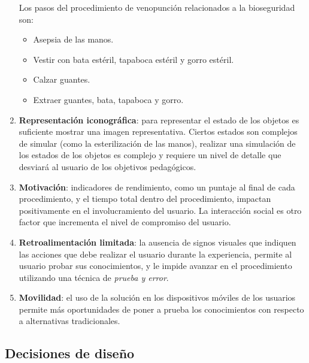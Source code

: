 \begin{enumerate}[label=\bfseries C\arabic*:]
    Los pasos del procedimiento de venopunción relacionados a la bioseguridad son:
    \begin{itemize}
        \item Asepsia de las manos.
        \item Vestir con bata estéril, tapaboca estéril y gorro estéril.
        \item Calzar guantes.
        \item Extraer guantes, bata, tapaboca y gorro.
    \end{itemize}
    
\item \textbf{Representación iconográfica}: para representar el estado de los
    objetos es suficiente mostrar una imagen representativa. Ciertos estados son
    complejos de simular (como la esterilización de las manos), realizar una
    simulación de los estados de los objetos es complejo y requiere un nivel de
    detalle que desviará al usuario de los objetivos pedagógicos.
    
\item \textbf{Motivación}: indicadores de rendimiento, como un puntaje al final
    de cada procedimiento, y el tiempo total dentro del procedimiento, impactan
    positivamente en el involucramiento del usuario. La interacción social es
    otro factor que incrementa el nivel de compromiso del usuario.

\item \textbf{Retroalimentación limitada}: la ausencia de signos visuales que
    indiquen las acciones que debe realizar el usuario durante la experiencia,
    permite al usuario probar sus conocimientos, y le impide avanzar en
    el procedimiento utilizando una técnica de \emph{prueba y error}.

\item \textbf{Movilidad}: el uso de la solución en los dispositivos móviles de
    los usuarios permite más oportunidades de poner a prueba los conocimientos
    con respecto a alternativas tradicionales.


\end{enumerate}

\subsection{Decisiones de diseño}

